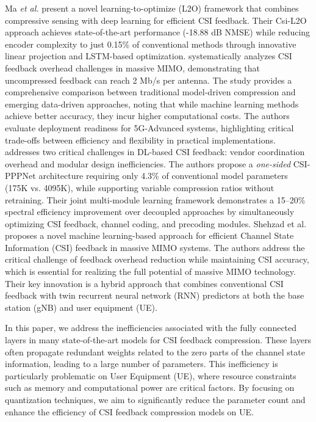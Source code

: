 \documentclass[lettersize,journal]{IEEEtran}
\begin{document}
Ma \textit{et al.} \cite{Ma2024} present a novel learning-to-optimize (L2O) framework that combines compressive sensing with deep learning for efficient CSI feedback. Their Csi-L2O approach achieves state-of-the-art performance (-18.88 dB NMSE) while reducing encoder complexity to just 0.15\% of conventional methods through innovative linear projection and LSTM-based optimization.
\cite{CSICompression2024} systematically analyzes CSI feedback overhead challenges in massive MIMO, demonstrating that uncompressed feedback can reach 2 Mb/s per antenna. The study provides a comprehensive comparison between traditional model-driven compression and emerging data-driven approaches, noting that while machine learning methods achieve better accuracy, they incur higher computational costs. The authors evaluate deployment readiness for 5G-Advanced systems, highlighting critical trade-offs between efficiency and flexibility in practical implementations.
\cite{Guo2024} addresses two critical challenges in DL-based CSI feedback: vendor coordination overhead and modular design inefficiencies. The authors propose a \textit{one-sided} CSI-PPPNet architecture requiring only 4.3\% of conventional model parameters (175K vs. 4095K), while supporting variable compression ratios without retraining. Their joint multi-module learning framework demonstrates a 15--20\% spectral efficiency improvement over decoupled approaches by simultaneously optimizing CSI feedback, channel coding, and precoding modules.
Shehzad et al. \cite{shehzad2021design} proposes a novel machine learning-based approach for efficient Channel State Information (CSI) feedback in massive MIMO systems. The authors address the critical challenge of feedback overhead reduction while maintaining CSI accuracy, which is essential for realizing the full potential of massive MIMO technology. Their key innovation is a hybrid approach that combines conventional CSI feedback with twin recurrent neural network (RNN) predictors at both the base station (gNB) and user equipment (UE).




In this paper, we address the inefficiencies associated with the fully connected layers in many state-of-the-art models for CSI feedback compression. These layers often propagate redundant weights related to the zero parts of the channel state information, leading to a large number of parameters. This inefficiency is particularly problematic on User Equipment (UE), where resource constraints such as memory and computational power are critical factors. By focusing on quantization techniques, we aim to significantly reduce the parameter count and enhance the efficiency of CSI feedback compression models on UE.
\end{document}
